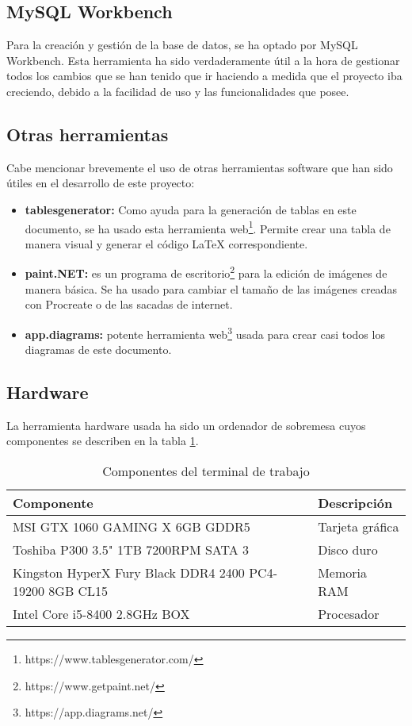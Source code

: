 \subsection{MySQL Workbench}
\label{sub:mysql}
Para la creación y gestión de la base de datos, se ha optado por MySQL Workbench\cite{mysql}. Esta herramienta ha sido verdaderamente útil a la hora de gestionar todos los cambios que se han tenido que ir haciendo a medida que el proyecto iba creciendo, debido a la facilidad de uso y las funcionalidades que posee.


\subsection{Otras herramientas}
Cabe mencionar brevemente el uso de otras herramientas software que han sido útiles en el desarrollo de este proyecto:
\begin{itemize}
	\item \textbf{tablesgenerator:} Como ayuda para la generación de tablas en este documento, se ha usado esta herramienta web\footnote{https://www.tablesgenerator.com/}. Permite crear una tabla de manera visual y generar el código \LaTeX{} correspondiente.
	\item \textbf{paint.NET:} es un programa de escritorio\footnote{https://www.getpaint.net/} para la edición de imágenes de manera básica. Se ha usado para cambiar el tamaño de las imágenes creadas con Procreate o de las sacadas de internet.
	\item \textbf{app.diagrams:} potente herramienta web\footnote{https://app.diagrams.net/} usada para crear casi todos los diagramas de este documento.
\end{itemize}

\subsection{Hardware}
La herramienta hardware usada ha sido un ordenador de sobremesa cuyos componentes se describen en la tabla \ref{tab:tablacomponentes}.

\begin{table}[H]
\caption{Componentes del terminal de trabajo}
\centering
\label{tab:tablacomponentes}
\begin{tabular}{@{}ll@{}}
\hline
\textbf{Componente}                                     & \textbf{Descripción} \\ \hline
MSI GTX 1060 GAMING X 6GB GDDR5                         & Tarjeta gráfica      \\ \hline
Toshiba P300 3.5" 1TB 7200RPM SATA 3                    & Disco duro           \\ \hline
Kingston HyperX Fury Black DDR4 2400 PC4-19200 8GB CL15 & Memoria RAM          \\ \hline
Intel Core i5-8400 2.8GHz BOX                           & Procesador           \\ \hline
\end{tabular}
\end{table}